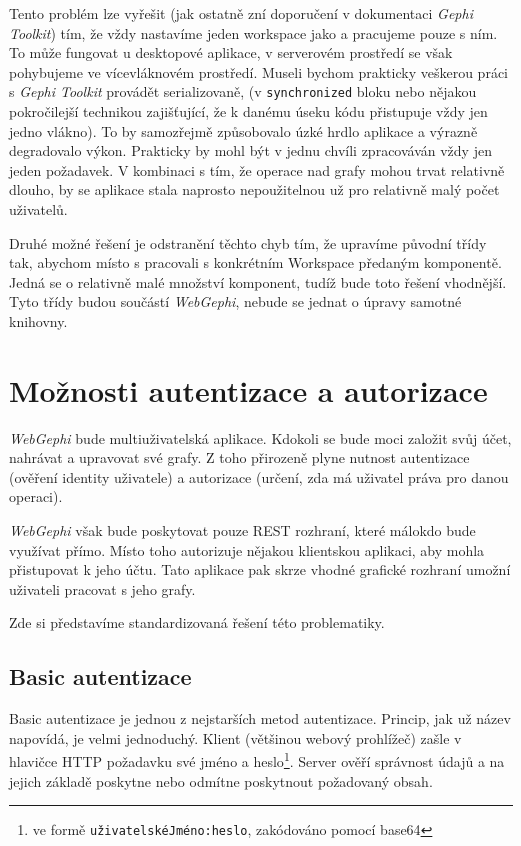 \documentclass[thesis=M,czech]{FITthesis}[2014/05/6]
\begin{document}
 Tento problém lze vyřešit (jak ostatně zní doporučení v dokumentaci \textit{Gephi Toolkit}) tím, že vždy nastavíme jeden workspace jako  a pracujeme pouze s ním.
 To může fungovat u desktopové aplikace, v serverovém prostředí se však pohybujeme ve vícevláknovém prostředí. Museli bychom prakticky veškerou práci s \textit{Gephi Toolkit}
 provádět serializovaně, (v \texttt{synchronized} bloku nebo nějakou pokročilejší technikou zajišťující, že k danému úseku kódu přistupuje vždy jen jedno vlákno). To
 by samozřejmě způsobovalo úzké hrdlo aplikace a výrazně degradovalo výkon. Prakticky by mohl být v jednu chvíli zpracováván vždy jen jeden požadavek.
 V kombinaci s tím, že operace nad grafy mohou trvat relativně dlouho, by se aplikace stala naprosto nepoužitelnou už pro relativně malý počet uživatelů.
 
 Druhé možné řešení je odstranění těchto chyb tím, že upravíme původní třídy tak, abychom místo s  pracovali s konkrétním Work\-space předaným komponentě.
 Jedná se o relativně malé množství komponent, tudíž bude toto řešení vhodnější. Tyto třídy budou součástí \textit{WebGephi}, nebude se jednat o úpravy samotné knihovny.
 
\section{Možnosti autentizace a autorizace}
\textit{WebGephi} bude multiuživatelská aplikace. Kdokoli se bude moci založit svůj účet, nahrávat a upravovat své grafy.
Z toho přirozeně plyne nutnost autentizace (ověření identity uživatele) a autorizace (určení, zda má uživatel práva pro danou operaci).

\textit{WebGephi} však bude poskytovat pouze REST rozhraní, které málokdo bude využívat přímo. Místo toho autorizuje nějakou klientskou aplikaci, aby
mohla přistupovat k jeho účtu. Tato aplikace pak skrze vhodné grafické rozhraní umožní uživateli pracovat s jeho grafy.

Zde si představíme standardizovaná řešení této problematiky.

\subsection{Basic autentizace\cite{wiki:basic}}
Basic autentizace je jednou z nejstarších metod autentizace. Princip, jak už název napovídá, je velmi jednoduchý. Klient (většinou webový prohlížeč) zašle
v hlavičce HTTP požadavku své jméno a heslo\footnote{ve formě \texttt{uživatelskéJméno:heslo}, zakódováno pomocí base64}. Server ověří správnost údajů a na jejich základě poskytne nebo
odmítne poskytnout požadovaný obsah.
\end{document}
